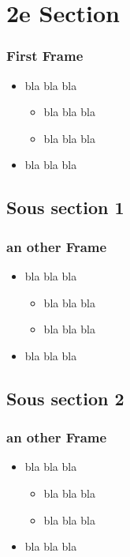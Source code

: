 \documentclass{beamer}
\begin{document}
\section[2e] { 2e Section }
\begin{frame}
\frametitle{First Frame}

\begin{itemize}
\item bla bla bla
  \begin{itemize}
    \item bla bla bla
    \item bla bla bla
  \end{itemize}
\item bla bla bla
\end{itemize}

\end{frame}
\subsection { Sous section 1}
\begin{frame}
\frametitle{an other Frame}

\begin{itemize}
\item bla bla bla
  \begin{itemize}
    \item bla bla bla
    \item bla bla bla
  \end{itemize}
\item bla bla bla
\end{itemize}

\end{frame}
\subsection { Sous section 2}
\begin{frame}
\frametitle{an other Frame}

\begin{itemize}
\item bla bla bla
  \begin{itemize}
    \item bla bla bla
    \item bla bla bla
  \end{itemize}
\item bla bla bla
\end{itemize}

\end{frame}
\end{document}

